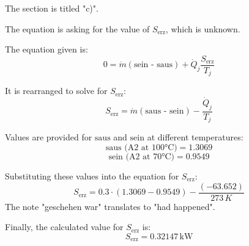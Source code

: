 The section is titled "c)".

The equation is asking for the value of \( S_{\text{erz}} \), which is unknown.

The equation given is:
\[ 0 = \dot{m} (\text{sein - saus}) + \dot{Q}_j \frac{S_{\text{erz}}}{T_j} \]

It is rearranged to solve for \( S_{\text{erz}} \):
\[ S_{\text{erz}} = \dot{m} (\text{saus - sein}) - \frac{\dot{Q}_j}{T_j} \]

Values are provided for \( \text{saus} \) and \( \text{sein} \) at different temperatures:
\[ \text{saus} \text{ (A2 at 100°C)} = 1.3069 \]
\[ \text{sein} \text{ (A2 at 70°C)} = 0.9549 \]

Substituting these values into the equation for \( S_{\text{erz}} \):
\[ S_{\text{erz}} = 0.3 \cdot (1.3069 - 0.9549) - \frac{(-63.652)}{273 \, K} \]
The note "geschehen war" translates to "had happened".

Finally, the calculated value for \( S_{\text{erz}} \) is:
\[ S_{\text{erz}} = 0.32147 \, \text{kW} \]